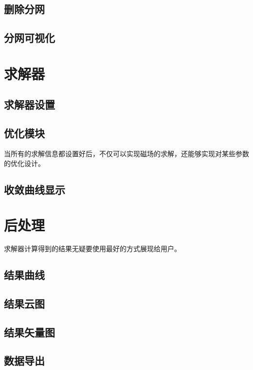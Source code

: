 \subsection{删除分网}

\subsection{分网可视化}

\section{求解器}

\subsection{求解器设置}

\subsection{优化模块}
当所有的求解信息都设置好后，不仅可以实现磁场的求解，还能够实现对某些参数的优化设计。

\subsection{收敛曲线显示}

\section{后处理}
求解器计算得到的结果无疑要使用最好的方式展现给用户。
\subsection{结果曲线}

\subsection{结果云图}

\subsection{结果矢量图}

\subsection{数据导出}